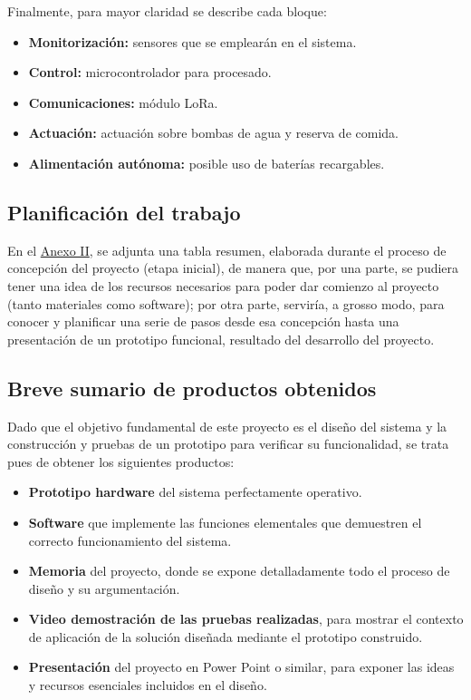 \documentclass[12pt]{article}
\begin{document}
	\noindent Finalmente, para mayor claridad se describe cada bloque:
	
	\begin{itemize}
		\item \textbf{Monitorización:} sensores que se emplearán en el sistema.
		\item \textbf{Control: }microcontrolador para procesado.
		\item \textbf{Comunicaciones: }módulo LoRa.
		\item \textbf{Actuación: } actuación sobre bombas de agua y reserva de comida.
		\item \textbf{Alimentación autónoma:} posible uso de baterías recargables.
	\end{itemize}
	
	
	\subsection[Planificación del trabajo]{Planificación del trabajo}
	
	\noindent En el \hyperref[anexo II: presupuesto]{Anexo II}, se adjunta una tabla resumen, elaborada durante el proceso de concepción del proyecto (etapa inicial), de manera que, por una parte, se pudiera tener una idea de los recursos necesarios para poder dar comienzo al proyecto (tanto materiales como software); por otra parte, serviría, a grosso modo, para conocer y planificar una serie de pasos desde esa concepción hasta una presentación de un prototipo funcional, resultado del desarrollo del proyecto. 
	
	\subsection[Breve sumario de productos obtenidos]{Breve sumario de productos obtenidos}
	
	\noindent Dado que el objetivo fundamental de este proyecto es el diseño del sistema y la
construcción y pruebas de un prototipo para verificar su funcionalidad, se trata pues
de obtener los siguientes productos:
	
	\begin{itemize}
		\item \textbf{Prototipo hardware} del sistema perfectamente operativo.
		\item \textbf{Software} que implemente las funciones elementales que demuestren el
correcto funcionamiento del sistema.
		\item \textbf{Memoria} del proyecto, donde se expone detalladamente todo el proceso de
diseño y su argumentación.
		\item \textbf{Video demostración de las pruebas realizadas}, para mostrar el
contexto de aplicación de la solución diseñada mediante el prototipo
construido.
		\item \textbf{Presentación} del proyecto en Power Point o similar, para exponer las ideas y
recursos esenciales incluidos en el diseño.
	\end{itemize}
	
\end{document}
